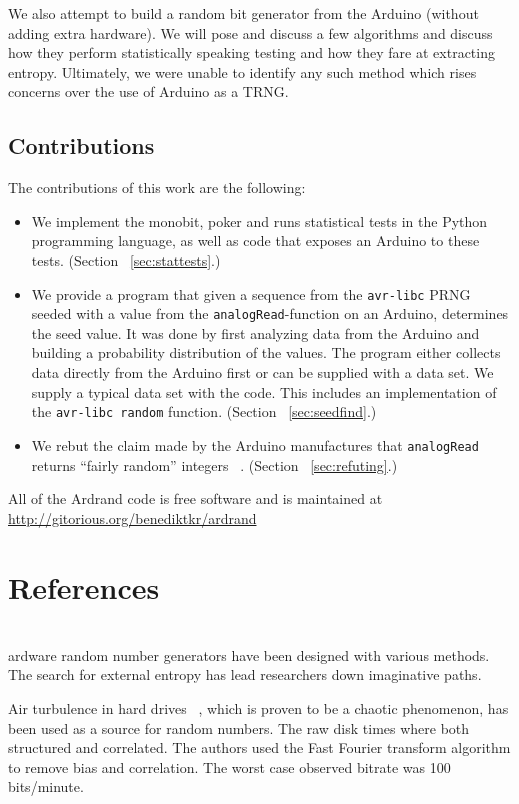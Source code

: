 \documentclass[a4paper]{article}           %
\newcommand{\tmpsection}[1]{}
\let\tmpsection=\section
\renewcommand{\section}[2]{

    \ifthenelse{
      \equal{#2}{*} %
    }
    {
      \tmpsection{References}
      \tmpsection{\sc{#2} }
    }
    {\tmpsection{\sc{#1} } }
      

}
\begin{document}
We also attempt to build a random bit generator from the Arduino (without adding extra hardware). We will pose and discuss a few algorithms and discuss how they perform statistically speaking testing and how they fare at extracting entropy. Ultimately, we were unable to identify any such method which rises concerns over the use of Arduino as a TRNG. 

\subsection{Contributions}

The contributions of this work are the following:

\begin{itemize}
\item We implement the monobit, poker and runs statistical tests in the Python programming language, as well as code that exposes an Arduino to these tests. (Section ~\ref{sec:stattests}.)
\item We provide a program that given a sequence from the \texttt{avr-libc} PRNG seeded with a value from the \texttt{analogRead}-function on an Arduino, determines the seed value. It was done by first analyzing data from the Arduino and building a probability distribution of the values. The program either collects data directly from the Arduino first or can be supplied with a data set. We supply a typical data set with the code. This includes an implementation of the \texttt{avr-libc random} function. (Section ~\ref{sec:seedfind}.)
\item We rebut the claim made by the Arduino manufactures that \texttt{analogRead} returns ``fairly random'' integers ~\cite{ardref}. (Section ~\ref{sec:refuting}.)

\end{itemize}

All of the Ardrand code is free software and is maintained at \url{http://gitorious.org/benediktkr/ardrand}

\section{Related Work -  Background}

Hardware random number generators have been designed with various methods. The search for external entropy has lead researchers down imaginative paths.

Air turbulence in hard drives ~\cite{airturb}, which is proven to be a chaotic phenomenon, has been used as a source for random numbers. The raw disk times where both structured and correlated. The authors used the Fast Fourier transform algorithm to remove bias and correlation. The worst case observed bitrate was 100 bits/minute. 
\end{document}
